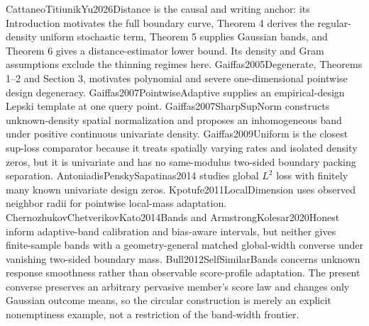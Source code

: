 CattaneoTitiunikYu2026Distance is the causal and writing anchor: its Introduction motivates the full boundary curve, Theorem 4 derives the regular-density uniform stochastic term, Theorem 5 supplies Gaussian bands, and Theorem 6 gives a distance-estimator lower bound. Its density and Gram assumptions exclude the thinning regimes here. Gaiffas2005Degenerate, Theorems 1--2 and Section 3, motivates polynomial and severe one-dimensional pointwise design degeneracy. Gaiffas2007PointwiseAdaptive supplies an empirical-design Lepski template at one query point. Gaiffas2007SharpSupNorm constructs unknown-density spatial normalization and proposes an inhomogeneous band under positive continuous univariate density. Gaiffas2009Uniform is the closest sup-loss comparator because it treats spatially varying rates and isolated density zeros, but it is univariate and has no same-modulus two-sided boundary packing separation. AntoniadisPenskySapatinas2014 studies global \(L^2\) loss with finitely many known univariate design zeros. Kpotufe2011LocalDimension uses observed neighbor radii for pointwise local-mass adaptation. ChernozhukovChetverikovKato2014Bands and ArmstrongKolesar2020Honest inform adaptive-band calibration and bias-aware intervals, but neither gives finite-sample bands with a geometry-general matched global-width converse under vanishing two-sided boundary mass. Bull2012SelfSimilarBands concerns unknown response smoothness rather than observable score-profile adaptation. The present converse preserves an arbitrary pervasive member's score law and changes only Gaussian outcome means, so the circular construction is merely an explicit nonemptiness example, not a restriction of the band-width frontier.